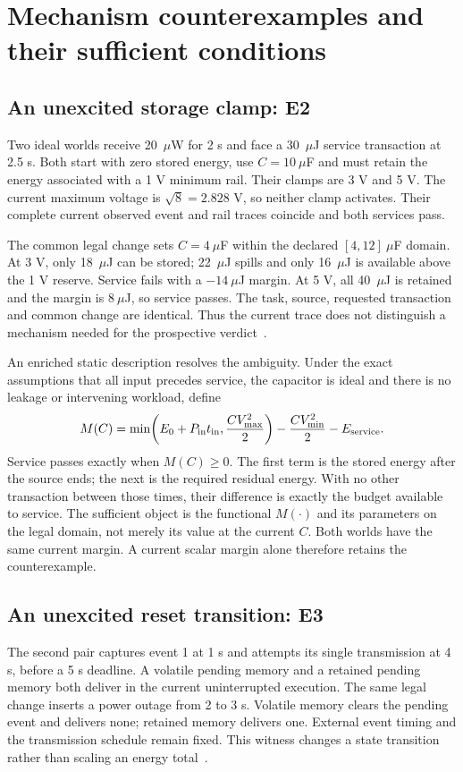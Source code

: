 \section{Mechanism counterexamples and their sufficient conditions}
\subsection{An unexcited storage clamp: E2}
Two ideal worlds receive 20~$\mu$W for 2 s and face a 30~$\mu$J service
transaction at 2.5 s. Both start with zero stored energy, use
$C=10~\mu$F and must retain the energy associated with a 1 V minimum rail.
Their clamps are 3 V and 5 V. The current maximum voltage is
$\sqrt{8}=2.828$ V, so neither clamp activates. Their complete current
observed event and rail traces coincide and both services pass.

The common legal change sets $C=4~\mu$F within the declared
$[4,12]~\mu$F domain. At 3 V, only 18~$\mu$J can be stored; 22~$\mu$J
spills and only 16~$\mu$J is available above the 1 V reserve. Service
fails with a $-14~\mu$J margin. At 5 V, all 40~$\mu$J is retained and
the margin is $8~\mu$J, so service passes. The task, source, requested
transaction and common change are identical. Thus the current trace does
not distinguish a mechanism needed for the prospective verdict~\cite{structural}.

An enriched static description resolves the ambiguity. Under the exact
assumptions that all input precedes service, the capacitor is ideal and
there is no leakage or intervening workload, define
\begin{equation}
 M(C)=\min\!\left(E_0+P_{\rm in}t_{\rm in},\frac{CV_{\max}^2}{2}\right)
       -\frac{CV_{\min}^2}{2}-E_{\rm service}.
 \label{eq:margin}
\end{equation}
Service passes exactly when $M(C)\geq0$. The first term is the stored
energy after the source ends; the next is the required residual energy.
With no other transaction between those times, their difference is exactly
the budget available to service. The sufficient object is the functional
$M(\cdot)$ and its parameters on the legal domain, not merely its value at
the current $C$. Both worlds have the same current margin. A current scalar
margin alone therefore retains the counterexample.

\subsection{An unexcited reset transition: E3}
The second pair captures event 1 at 1 s and attempts its single transmission
at 4 s, before a 5 s deadline. A volatile pending memory and a retained
pending memory both deliver in the current uninterrupted execution. The
same legal change inserts a power outage from 2 to 3 s. Volatile memory
clears the pending event and delivers none; retained memory delivers one.
External event timing and the transmission schedule remain fixed.
This witness changes a state transition rather than scaling an energy
total~\cite{structural}.


